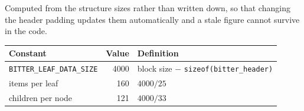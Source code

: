 Computed from the structure sizes rather than written down, so that changing
the header padding updates them automatically and a stale figure cannot survive
in the code.

\begin{center}
\begin{tabular}{lrl}
  \toprule
  Constant & Value & Definition \\
  \midrule
  \texttt{BITTER\_LEAF\_DATA\_SIZE} & 4000 & block size $-$ \texttt{sizeof(bitter\_header)} \\
  items per leaf                    & 160  & $4000 / 25$ \\
  children per node                 & 121  & $4000 / 33$ \\
  \bottomrule
\end{tabular}
\end{center}
